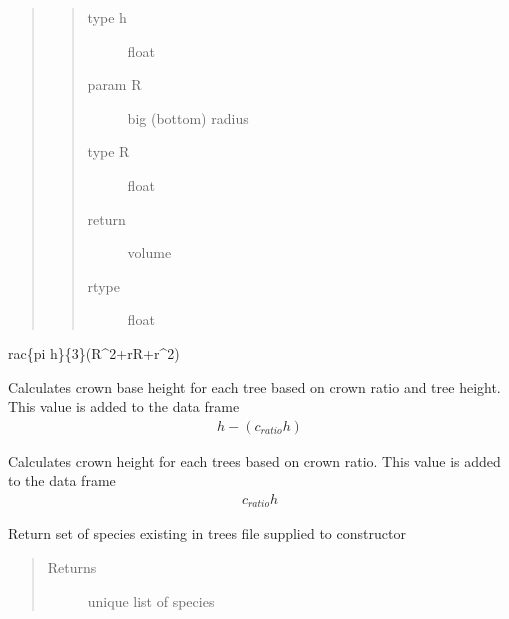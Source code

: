 \documentclass[letterpaper,10pt,english]{sphinxmanual}
\begin{document}
\begin{fulllineitems}
\begin{fulllineitems}
\begin{quote}
\begin{quote}
\begin{description}
\item[{type h}] \leavevmode
float

\item[{param R}] \leavevmode
big (bottom) radius

\item[{type R}] \leavevmode
float

\item[{return}] \leavevmode
volume

\item[{rtype}] \leavevmode
float

\end{description}\end{quote}
\end{quote}

rac\{pi h\}\{3\}(R\textasciicircum{}2+rR+r\textasciicircum{}2)

\end{fulllineitems}


\begin{fulllineitems}
\label{fuels_FuelCalc:fuels.FuelCalc.get_crown_base_ht}
Calculates crown base height for each tree based on crown ratio and
tree height. This value is added to the data frame
\begin{equation*}
\begin{split}h - (c_{ratio} h)\end{split}
\end{equation*}
\end{fulllineitems}


\begin{fulllineitems}
\label{fuels_FuelCalc:fuels.FuelCalc.get_crown_ht}
Calculates crown height for each trees based on crown ratio. This
value is added to the data frame
\begin{equation*}
\begin{split}c_{ratio}h\end{split}
\end{equation*}
\end{fulllineitems}


\begin{fulllineitems}
\label{fuels_FuelCalc:fuels.FuelCalc.get_species_list}
Return set of species existing in trees file supplied to constructor
\begin{quote}\begin{description}
\item[{Returns}] \leavevmode
unique list of species


\end{description}
\end{quote}
\end{fulllineitems}
\end{fulllineitems}
\end{document}
